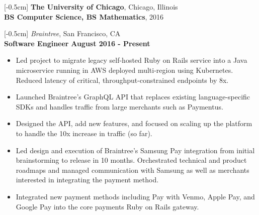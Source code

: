 \documentclass[9pt]{res} %
\begin{document}

\address{
    178 Church Street\\  
    San Francisco, CA 94114 \\   
    \href{mailto:kira.ghandhi@gmail.com}{kira.ghandhi@gmail.com}  $\bullet$ (650)743-8198 $\bullet$ \url{https://github.com/kghandhi} \\
}

\begin{resume}                         
[-0.5cm]  
\textbf{\color{Maroon}The University of Chicago}, Chicago, Illinois \\
\textbf{BS Computer Science, BS Mathematics}, 2016 \\
\vspace{-4pt}

[-0.5cm]
\textit{\color{MidnightBlue}Braintree}, San Francisco, CA \\
\textbf{Software Engineer}
\hspace*{\fill} \textbf{August 2016 - Present}
\begin{itemize}
\item Led project to migrate legacy self-hosted Ruby on Rails service into a Java microservice running in AWS deployed multi-region using Kubernetes. Reduced latency of critical, throughput-constrained endpoints by 8x.
\item Launched Braintree's GraphQL API that replaces existing language-specific SDKs and handles traffic from large merchants such as Paymentus. 
\item Designed the API, add new features, and focused on scaling up the platform to handle the 10x increase in traffic (so far). 
\item Led design and execution of Braintree's Samsung Pay integration from initial brainstorming to release in 10 months. Orchestrated technical and product roadmaps and managed communication with Samsung as well as merchants interested in integrating the payment method.
\item Integrated new payment methods including Pay with Venmo, Apple Pay, and Google Pay into the core payments Ruby on Rails gateway.
\end{itemize}


\end{resume}
\end{document}
